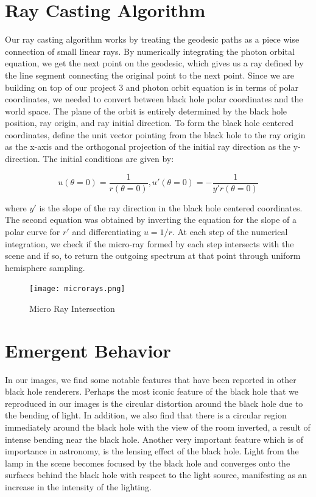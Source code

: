 \documentclass[sigconf]{acmart}
\begin{document}
\section{Ray Casting Algorithm}

Our ray casting algorithm works by treating the geodesic paths as a piece wise connection of small linear rays. By numerically integrating the photon orbital equation, we get the next point on the geodesic, which gives us a ray defined by the line segment connecting the original point to the next point. Since we are building on top of our project 3\cite{ng_ragan-kelley} and photon orbit equation is in terms of polar coordinates, we needed to convert between black hole polar coordinates and the world space.  The plane of the orbit is entirely determined by the black hole position, ray origin, and ray initial direction.  To form the black hole centered coordinates, define the unit vector pointing from the black hole to the ray origin as the x-axis and the orthogonal projection of the initial ray direction as the y-direction.  The initial conditions are given by:

\begin{displaymath}
  u(\theta = 0) = \frac{1}{r(\theta = 0)},
  u'(\theta = 0) = -\frac{1}{y'r(\theta = 0)}
\end{displaymath}

where $y'$ is the slope of the ray direction in the black hole centered coordinates.  The second equation was obtained by inverting the equation for the slope of a polar curve for $r'$ and differentiating $u = 1/r$. At each step of the numerical integration, we check if the micro-ray formed by each step intersects with the scene and if so, to return the outgoing spectrum at that point through uniform hemisphere sampling.

\begin{figure}[h]
  \centering
  \texttt{[image: microrays.png]}
  \caption{Micro Ray Intersection}
  \Description{}
\end{figure}

\section{Emergent Behavior}

In our images, we find some notable features that have been reported in other black hole renderers. Perhaps the most iconic feature of the black hole that we reproduced in our images is the circular distortion around the black hole due to the bending of light.  In addition, we also find that there is a circular region immediately around the black hole with the view of the room inverted, a result of intense bending near the black hole.  Another very important feature which is of importance in astronomy, is the lensing effect of the black hole.  Light from the lamp in the scene becomes focused by the black hole and converges onto the surfaces behind the black hole with respect to the light source, manifesting as an increase in the intensity of the lighting.
\end{document}
